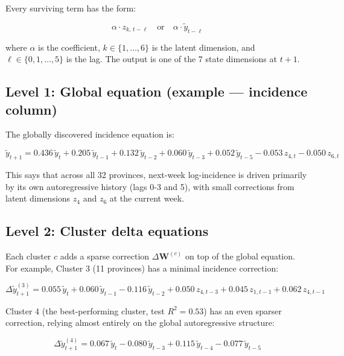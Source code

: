 \documentclass{article}
\begin{document}
Every surviving term has the form:

\begin{equation}
    \alpha \cdot z_{k,\, t - \ell}
    \quad \text{or} \quad
    \alpha \cdot \tilde{y}_{t-\ell}
\end{equation}

where $\alpha$ is the coefficient, $k \in \{1,\ldots,6\}$ is the latent dimension,
and $\ell \in \{0,1,\ldots,5\}$ is the lag. The output is one of the 7 state dimensions
at $t+1$.

\subsection*{Level 1: Global equation (example — incidence column)}

The globally discovered incidence equation is:

\begin{equation}
    \tilde{y}_{t+1}
    = 0.436\,\tilde{y}_{t}
    + 0.205\,\tilde{y}_{t-1}
    + 0.132\,\tilde{y}_{t-2}
    + 0.060\,\tilde{y}_{t-3}
    + 0.052\,\tilde{y}_{t-5}
    - 0.053\,z_{4,t}
    - 0.050\,z_{6,t}
\end{equation}

This says that across all 32 provinces, next-week log-incidence is driven primarily
by its own autoregressive history (lags 0-3 and 5), with small corrections from
latent dimensions $z_4$ and $z_6$ at the current week.

\subsection*{Level 2: Cluster delta equations}

Each cluster $c$ adds a sparse correction $\Delta\mathbf{W}^{(c)}$ on top of the global equation.
For example, Cluster 3 (11 provinces) has a minimal incidence correction:

\begin{equation}
    \Delta\tilde{y}^{(3)}_{t+1}
    = 0.055\,\tilde{y}_{t}
    + 0.060\,\tilde{y}_{t-1}
    - 0.116\,\tilde{y}_{t-2}
    + 0.050\,z_{4,t-3}
    + 0.045\,z_{1,t-1}
    + 0.062\,z_{4,t-1}
\end{equation}

Cluster 4 (the best-performing cluster, test $R^2 = 0.53$) has an even sparser correction,
relying almost entirely on the global autoregressive structure:

\begin{equation}
    \Delta\tilde{y}^{(4)}_{t+1}
    = 0.067\,\tilde{y}_{t}
    - 0.080\,\tilde{y}_{t-3}
    + 0.115\,\tilde{y}_{t-4}
    - 0.077\,\tilde{y}_{t-5}
\end{equation}
\end{document}
